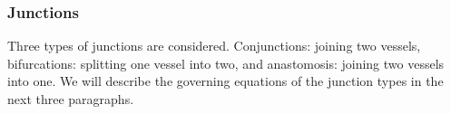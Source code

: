 \documentclass[a4paper, oneside]{discothesis}
\begin{document}

	\subsubsection{Junctions} \label{sssec:junctions}
	Three types of junctions are considered.
	Conjunctions: joining two vessels, bifurcations: splitting one vessel into two, and anastomosis: joining two vessels into one.
	We will describe the governing equations of the junction types in the next three paragraphs. 
\end{document}
